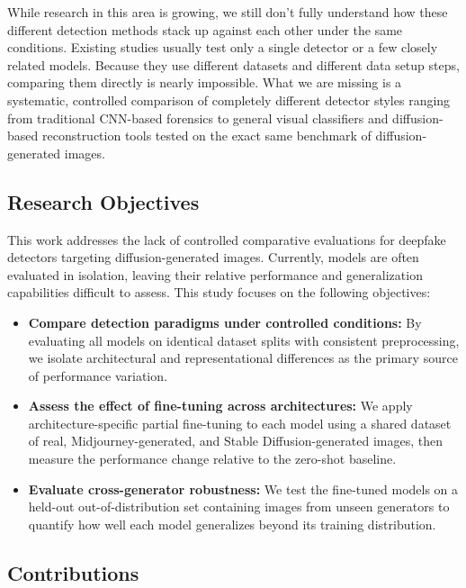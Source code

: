 While research in this area is growing, we still don't fully understand how these different detection methods stack up against each other under the same conditions. Existing studies usually test only a single detector or a few closely related models. Because they use different datasets and different data setup steps, comparing them directly is nearly impossible. What we are missing is a systematic, controlled comparison of completely different detector styles ranging from traditional CNN-based forensics to general visual classifiers and diffusion-based reconstruction tools tested on the exact same benchmark of diffusion-generated images.

\subsection{Research Objectives}
\label{subsec:research-objectives}

This work addresses the lack of controlled comparative evaluations for deepfake detectors targeting diffusion-generated images. Currently, models are often evaluated in isolation, leaving their relative performance and generalization capabilities difficult to assess. This study focuses on the following objectives:

\begin{itemize}
    \item \textbf{Compare detection paradigms under controlled conditions:} By evaluating all models on identical dataset splits with consistent preprocessing, we isolate architectural and representational differences as the primary source of performance variation.
    \item \textbf{Assess the effect of fine-tuning across architectures:} We apply architecture-specific partial fine-tuning to each model using a shared dataset of real, Midjourney-generated, and Stable Diffusion-generated images, then measure the performance change relative to the zero-shot baseline.
    \item \textbf{Evaluate cross-generator robustness:} We test the fine-tuned models on a held-out out-of-distribution set containing images from unseen generators to quantify how well each model generalizes beyond its training distribution.
\end{itemize}

\subsection{Contributions}
\label{subsec:contributions}

